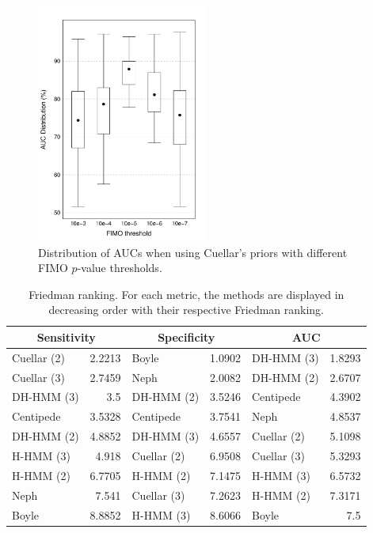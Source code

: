 \documentclass{bioinfo}
\begin{document}
\begin{figure}[t]
\centering
     \includegraphics[width=0.5\textwidth]{Figs/CuellarFimo}
\caption{Distribution of AUCs when using Cuellar's priors with different FIMO $p$-value thresholds.}
\label{fig:cuellar.fimo}
\end{figure}


\begin{table}[t]
\begin{center}
\caption{Friedman ranking. For each metric, the methods are displayed in decreasing order with their respective Friedman ranking.}
\label{tab:ranking}
\renewcommand{\arraystretch}{1.2}
  \begin{tabular}{ |lr|lr|lr| }
    \hline
    \multicolumn{2}{|c|}{\textbf{Sensitivity}} & \multicolumn{2}{|c|}{\textbf{Specificity}} & \multicolumn{2}{|c|}{\textbf{AUC}} \\
    \hline
      Cuellar (2) & 2.2213 & Boyle       & 1.0902 & DH-HMM (3)  & 1.8293 \\
      Cuellar (3) & 2.7459 & Neph        & 2.0082 & DH-HMM (2)  & 2.6707 \\
      DH-HMM (3)  & 3.5    & DH-HMM (2)  & 3.5246 & Centipede   & 4.3902 \\
      Centipede   & 3.5328 & Centipede   & 3.7541 & Neph        & 4.8537 \\
      DH-HMM (2)  & 4.8852 & DH-HMM (3)  & 4.6557 & Cuellar (2) & 5.1098 \\
      H-HMM (3)   & 4.918  & Cuellar (2) & 6.9508 & Cuellar (3) & 5.3293 \\
      H-HMM (2)   & 6.7705 & H-HMM (2)   & 7.1475 & H-HMM (3)   & 6.5732 \\
      Neph        & 7.541  & Cuellar (3) & 7.2623 & H-HMM (2)   & 7.3171 \\
      Boyle       & 8.8852 & H-HMM (3)   & 8.6066 & Boyle       & 7.5    \\
    \hline
  \end{tabular}
\end{center}
\end{table}
\end{document}
